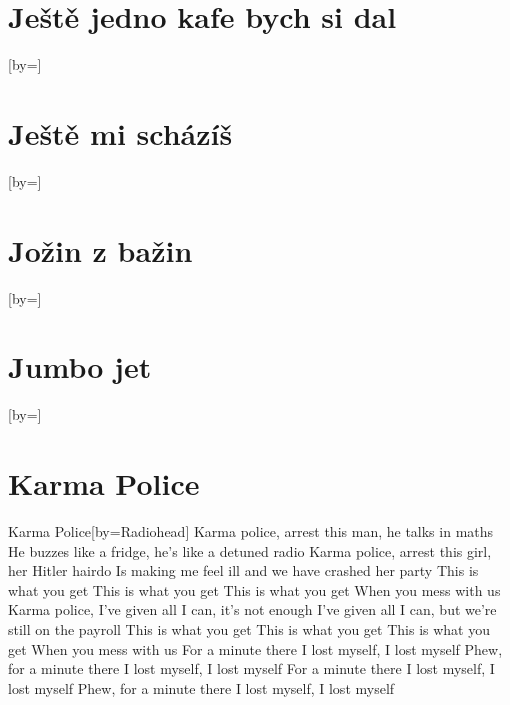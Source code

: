 \documentclass{article}
\begin{document}
\begin{songs}{}
\section{Ještě jedno kafe bych si dal}
\begin{song}{}[by={}]
\beginverse

\endverse
\end{song}

\section{Ještě mi scházíš}
\begin{song}{}[by={}]
\beginverse

\endverse
\end{song}

\section{Jožin z bažin}
\begin{song}{}[by={}]
\beginverse

\endverse
\end{song}

\section{Jumbo jet}
\begin{song}{}[by={}]
\beginverse

\endverse
\end{song}

\section{Karma Police}

\begin{song}{Karma Police}[by={Radiohead}]
\beginverse
Karma police, arrest this man, he talks in maths
He buzzes like a fridge, he's like a detuned radio
\endverse
\beginverse
Karma police, arrest this girl, her Hitler hairdo
Is making me feel ill and we have crashed her party
\endverse
\beginverse
This is what you get
This is what you get
This is what you get
When you mess with us
\endverse
\beginverse
Karma police, I've given all I can, it's not enough
I've given all I can, but we're still on the payroll
\endverse
\beginverse
This is what you get
This is what you get
This is what you get
When you mess with us
\endverse
\beginverse
For a minute there
I lost myself, I lost myself
Phew, for a minute there
I lost myself, I lost myself
For a minute there
I lost myself, I lost myself
Phew, for a minute there
I lost myself, I lost myself
\endverse
\end{song}





\end{songs}
\end{document}
